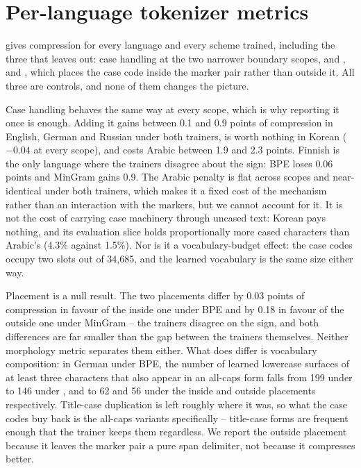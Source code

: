 \clearpage
\section{Per-language tokenizer metrics}
\label{app:allthetokenizers}

 gives compression for every language and every scheme trained,
including the three that  leaves out: case handling at the two
narrower boundary scopes,  and , and , which places
the case code inside the marker pair rather than outside it. All three are controls, and
none of them changes the picture.

Case handling behaves the same way at every scope, which is why reporting it once is
enough. Adding it gains between 0.1 and 0.9 points of compression in English, German and
Russian under both trainers, is worth nothing in Korean ($-0.04$ at every scope), and
costs Arabic between 1.9 and 2.3 points. Finnish is the only language where the trainers
disagree about the sign: BPE loses 0.06 points and MinGram gains 0.9. The Arabic penalty
is flat across scopes and near-identical under both trainers, which makes it a fixed cost
of the mechanism rather than an interaction with the markers, but we cannot account for
it. It is not the cost of carrying case machinery through uncased text: Korean pays
nothing, and its evaluation slice holds proportionally more cased characters than Arabic's
(4.3\% against 1.5\%). Nor is it a vocabulary-budget effect: the case codes occupy two
slots out of 34{,}685, and the learned vocabulary is the same size either way.

Placement is a null result. The two placements differ by 0.03 points of compression in
favour of the inside one under BPE and by 0.18 in favour of the outside one under MinGram
-- the trainers disagree on the sign, and both differences are far smaller than the gap
between the trainers themselves. Neither morphology metric separates them either. What
does differ is vocabulary composition: in German under BPE, the number of learned
lowercase surfaces of at least three characters that also appear in an all-caps form falls
from 199 under \plainscheme{} to 146 under , and to 62 and 56 under the inside
and outside placements respectively. Title-case duplication is left roughly where it was,
so what the case codes buy back is the all-caps variants specifically -- title-case forms
are frequent enough that the trainer keeps them regardless. We report the outside
placement because it leaves the marker pair a pure span delimiter, not because it
compresses better.

\begin{table}[h]

\end{table}
